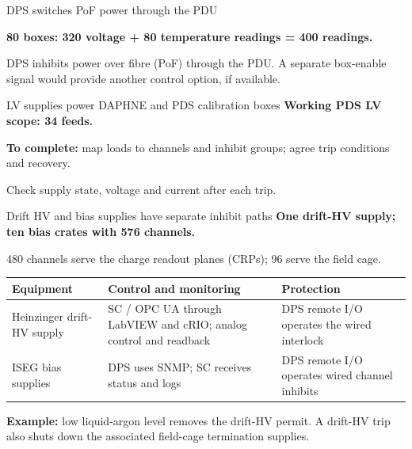 \documentclass[aspectratio=169,11pt]{beamer}
\begin{document}
\begin{frame}{DPS switches PoF power through the PDU}
\centering

\par\smallskip
\raggedright{}\par\smallskip
\raggedright

\textbf{80 boxes: 320 voltage + 80 temperature readings = 400 readings.}\par\medskip
DPS inhibits power over fibre (PoF) through the PDU. A separate box-enable signal would provide another control option, if available.
\end{frame}

\begin{frame}{LV supplies power DAPHNE and PDS calibration boxes}
\textbf{Working PDS LV scope: 34 feeds.}\par\medskip
\centering
{}\par\smallskip
\raggedright{}\par\medskip
\raggedright
\textbf{To complete:} map loads to channels and inhibit groups; agree trip conditions and recovery.\par\medskip
Check supply state, voltage and current after each trip.
\end{frame}

\begin{frame}{Drift HV and bias supplies have separate inhibit paths}
\textbf{One drift-HV supply; ten bias crates with 576 channels.}\par
480 channels serve the charge readout planes (CRPs); 96 serve the field cage.\par\bigskip
\renewcommand{\arraystretch}{1.35}
\begin{tabularx}{\textwidth}{@{}>{\RaggedRight\arraybackslash}p{2.1cm}>{\RaggedRight\arraybackslash}X>{\RaggedRight\arraybackslash}X@{}}
\toprule
\textbf{Equipment} & \textbf{Control and monitoring} & \textbf{Protection}\\\midrule
Heinzinger drift-HV supply & SC / OPC UA through LabVIEW and cRIO; analog control and readback & DPS remote I/O operates the wired interlock\\
ISEG bias supplies & DPS uses SNMP; SC receives status and logs & DPS remote I/O operates wired channel inhibits\\
\bottomrule
\end{tabularx}\par\bigskip
\textbf{Example:} low liquid-argon level removes the drift-HV permit. A drift-HV trip also shuts down the associated field-cage termination supplies.
\end{frame}
\end{document}
